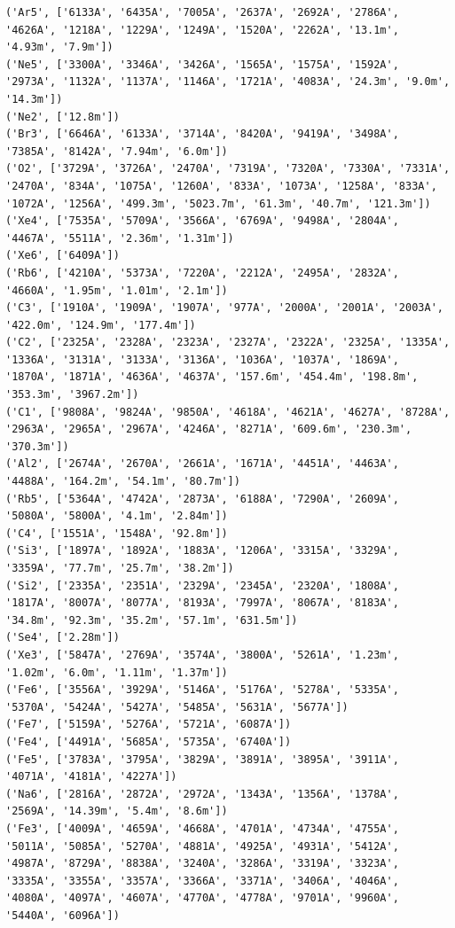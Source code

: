 \documentclass[11pt]{article}
\begin{document}
\begin{Verbatim}[commandchars=\\\{\}]
('Ar5', ['6133A', '6435A', '7005A', '2637A', '2692A', '2786A', '4626A', '1218A', '1229A', '1249A', '1520A', '2262A', '13.1m', '4.93m', '7.9m'])
('Ne5', ['3300A', '3346A', '3426A', '1565A', '1575A', '1592A', '2973A', '1132A', '1137A', '1146A', '1721A', '4083A', '24.3m', '9.0m', '14.3m'])
('Ne2', ['12.8m'])
('Br3', ['6646A', '6133A', '3714A', '8420A', '9419A', '3498A', '7385A', '8142A', '7.94m', '6.0m'])
('O2', ['3729A', '3726A', '2470A', '7319A', '7320A', '7330A', '7331A', '2470A', '834A', '1075A', '1260A', '833A', '1073A', '1258A', '833A', '1072A', '1256A', '499.3m', '5023.7m', '61.3m', '40.7m', '121.3m'])
('Xe4', ['7535A', '5709A', '3566A', '6769A', '9498A', '2804A', '4467A', '5511A', '2.36m', '1.31m'])
('Xe6', ['6409A'])
('Rb6', ['4210A', '5373A', '7220A', '2212A', '2495A', '2832A', '4660A', '1.95m', '1.01m', '2.1m'])
('C3', ['1910A', '1909A', '1907A', '977A', '2000A', '2001A', '2003A', '422.0m', '124.9m', '177.4m'])
('C2', ['2325A', '2328A', '2323A', '2327A', '2322A', '2325A', '1335A', '1336A', '3131A', '3133A', '3136A', '1036A', '1037A', '1869A', '1870A', '1871A', '4636A', '4637A', '157.6m', '454.4m', '198.8m', '353.3m', '3967.2m'])
('C1', ['9808A', '9824A', '9850A', '4618A', '4621A', '4627A', '8728A', '2963A', '2965A', '2967A', '4246A', '8271A', '609.6m', '230.3m', '370.3m'])
('Al2', ['2674A', '2670A', '2661A', '1671A', '4451A', '4463A', '4488A', '164.2m', '54.1m', '80.7m'])
('Rb5', ['5364A', '4742A', '2873A', '6188A', '7290A', '2609A', '5080A', '5800A', '4.1m', '2.84m'])
('C4', ['1551A', '1548A', '92.8m'])
('Si3', ['1897A', '1892A', '1883A', '1206A', '3315A', '3329A', '3359A', '77.7m', '25.7m', '38.2m'])
('Si2', ['2335A', '2351A', '2329A', '2345A', '2320A', '1808A', '1817A', '8007A', '8077A', '8193A', '7997A', '8067A', '8183A', '34.8m', '92.3m', '35.2m', '57.1m', '631.5m'])
('Se4', ['2.28m'])
('Xe3', ['5847A', '2769A', '3574A', '3800A', '5261A', '1.23m', '1.02m', '6.0m', '1.11m', '1.37m'])
('Fe6', ['3556A', '3929A', '5146A', '5176A', '5278A', '5335A', '5370A', '5424A', '5427A', '5485A', '5631A', '5677A'])
('Fe7', ['5159A', '5276A', '5721A', '6087A'])
('Fe4', ['4491A', '5685A', '5735A', '6740A'])
('Fe5', ['3783A', '3795A', '3829A', '3891A', '3895A', '3911A', '4071A', '4181A', '4227A'])
('Na6', ['2816A', '2872A', '2972A', '1343A', '1356A', '1378A', '2569A', '14.39m', '5.4m', '8.6m'])
('Fe3', ['4009A', '4659A', '4668A', '4701A', '4734A', '4755A', '5011A', '5085A', '5270A', '4881A', '4925A', '4931A', '5412A', '4987A', '8729A', '8838A', '3240A', '3286A', '3319A', '3323A', '3335A', '3355A', '3357A', '3366A', '3371A', '3406A', '4046A', '4080A', '4097A', '4607A', '4770A', '4778A', '9701A', '9960A', '5440A', '6096A'])

\end{Verbatim}
\end{document}
